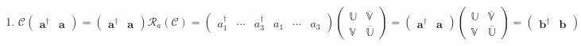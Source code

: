 \documentclass[aps,preprint]{revtex4}
\begin{document}
\begin{enumerate}
\item 
\begin{equation}
\mathcal{C}\left( 
\begin{array}{cc}
\boldsymbol{a}^{\dagger } & \boldsymbol{a}%
\end{array}%
\right) =\left( 
\begin{array}{cc}
\boldsymbol{a}^{\dagger } & \boldsymbol{a}%
\end{array}%
\right) \mathcal{R}_{a}\left( \mathcal{C}\right) =\left( 
\begin{array}{cccccc}
a_{1}^{\dagger } & \cdots & a_{3}^{\dagger } & a_{1} & \cdots & a_{3}%
\end{array}%
\right) \left( 
\begin{array}{cc}
\mathbb{U} & \overline{\mathbb{V}} \\ 
\mathbb{V} & \overline{\mathbb{U}}%
\end{array}%
\right) =\left( 
\begin{array}{cc}
\boldsymbol{a}^{\dagger } & \boldsymbol{a}%
\end{array}%
\right) \left( 
\begin{array}{cc}
\mathbb{U} & \overline{\mathbb{V}} \\ 
\mathbb{V} & \overline{\mathbb{U}}%
\end{array}%
\right) =\left( 
\begin{array}{cc}
\boldsymbol{b}^{\dagger } & \boldsymbol{b}%
\end{array}%
\right)
\end{equation}


\end{enumerate}
\end{document}
